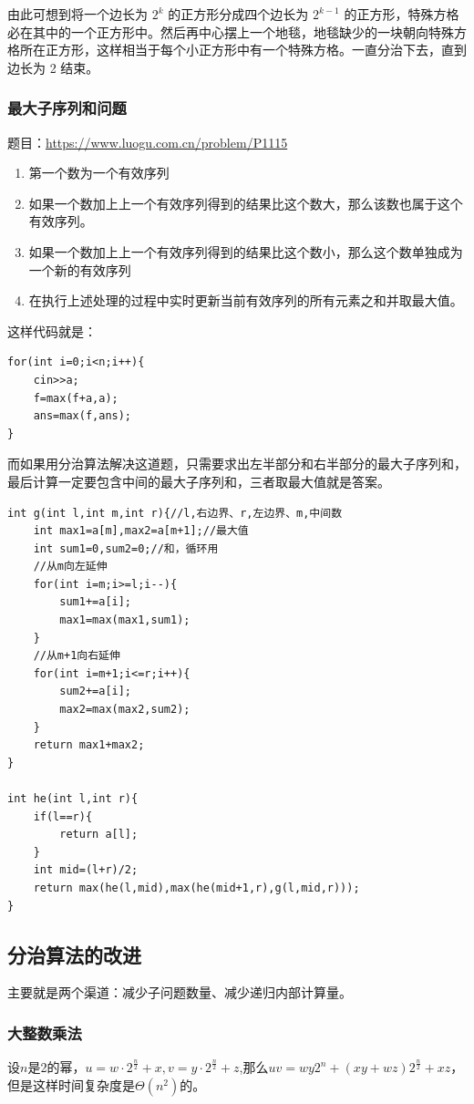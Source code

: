 \documentclass[./../main.tex]{subfiles}
\begin{document}
由此可想到将一个边长为 $2^{k}$ 的正方形分成四个边长为 $2^{k-1}$ 的正方形，特殊方格必在其中的一个正方形中。然后再中心摆上一个地毯，地毯缺少的一块朝向特殊方格所在正方形，这样相当于每个小正方形中有一个特殊方格。一直分治下去，直到边长为 2 结束。

\subsubsection{最大子序列和问题}

题目：\url{https://www.luogu.com.cn/problem/P1115}
\begin{enumerate}
    \item 第一个数为一个有效序列
    \item 如果一个数加上上一个有效序列得到的结果比这个数大，那么该数也属于这个有效序列。
    \item 如果一个数加上上一个有效序列得到的结果比这个数小，那么这个数单独成为一个新的有效序列
    \item 在执行上述处理的过程中实时更新当前有效序列的所有元素之和并取最大值。
\end{enumerate}

这样代码就是：
\begin{lstlisting}
for(int i=0;i<n;i++){
    cin>>a;
    f=max(f+a,a);
    ans=max(f,ans);
}
\end{lstlisting}

而如果用分治算法解决这道题，只需要求出左半部分和右半部分的最大子序列和，最后计算一定要包含中间的最大子序列和，三者取最大值就是答案。

\begin{lstlisting}
int g(int l,int m,int r){//l,右边界、r,左边界、m,中间数
	int max1=a[m],max2=a[m+1];//最大值
	int sum1=0,sum2=0;//和，循环用
    //从m向左延伸
	for(int i=m;i>=l;i--){
		sum1+=a[i];
		max1=max(max1,sum1);
	}
    //从m+1向右延伸
	for(int i=m+1;i<=r;i++){
		sum2+=a[i];
		max2=max(max2,sum2);
	}
	return max1+max2;
}

int he(int l,int r){
	if(l==r){
		return a[l];
	}
	int mid=(l+r)/2;
	return max(he(l,mid),max(he(mid+1,r),g(l,mid,r)));
}
\end{lstlisting}


\subsection{分治算法的改进}
主要就是两个渠道：减少子问题数量、减少递归内部计算量。

\subsubsection{大整数乘法}
设$n$是2的幂，$u=w\cdot2^{\frac{n}{2}}+x,v=y\cdot2^{\frac{n}{2}}+z$,那么$uv=wy2^n+(xy+wz)2^{\frac{n}{2}}+xz$，但是这样时间复杂度是$\Theta(n^2)$的。
\end{document}

